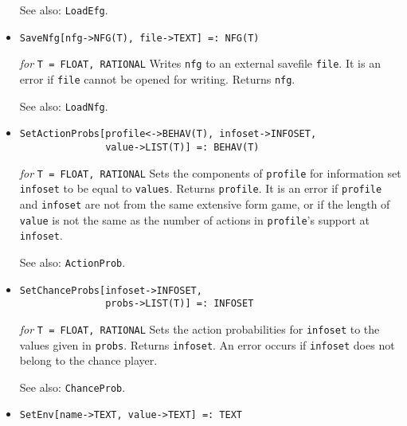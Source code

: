 \begin{itemize}
{\it for} {\tt T = FLOAT, RATIONAL}
\bd
Writes \verb+efg+ to an external savefile \verb+file+.  It is an error
if \verb+file+ cannot be opened for writing.  Returns \verb+efg+.
\item [See also:] \verb+LoadEfg+.
\ed

\item
\protect \large \begin{verbatim}
SaveNfg[nfg->NFG(T), file->TEXT] =: NFG(T)
\end{verbatim}\normalsize

{\it for} {\tt T = FLOAT, RATIONAL}
\bd
Writes \verb+nfg+ to an external savefile \verb+file+.  It is an
error if \verb+file+ cannot be opened for writing.  Returns \verb+nfg+.
\item [See also:] \verb+LoadNfg+.
\ed

\item
\protect \large \begin{verbatim} 
SetActionProbs[profile<->BEHAV(T), infoset->INFOSET,
               value->LIST(T)] =: BEHAV(T) 
\end{verbatim}\normalsize

{\it for} {\tt T = FLOAT, RATIONAL}
\bd
Sets the components of \verb+profile+ for
information set \verb+infoset+ to be equal to \verb+values+.
Returns \verb+profile+.  It is an error if \verb+profile+ and \verb+infoset+
are not from the same extensive form game, or if the length of
\verb+value+ is not the same as the number of actions in \verb+profile+'s
support at \verb+infoset+.
\item [See also:] \verb+ActionProb+.
\ed

\item
\protect \large \begin{verbatim} 
SetChanceProbs[infoset->INFOSET, 
               probs->LIST(T)] =: INFOSET
\end{verbatim}\normalsize

{\it for} {\tt T = FLOAT, RATIONAL}
\bd
Sets the action probabilities for 
\verb+infoset+ to the values given in \verb+probs+.  Returns \verb+infoset+. 
An error occurs if \verb+infoset+ does not belong to the chance player.
\item [See also:] \verb+ChanceProb+.
\ed

\item
\protect \large \begin{verbatim}
SetEnv[name->TEXT, value->TEXT] =: TEXT
\end{verbatim} \normalsize


\end{itemize}
